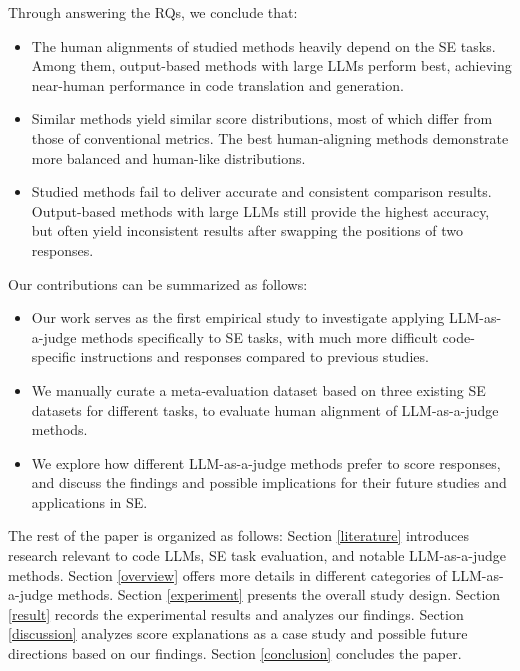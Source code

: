 Through answering the RQs, we conclude that:
\begin{itemize}
    \item The human alignments of studied methods heavily depend on the SE tasks. Among them, output-based methods with large LLMs perform best, achieving near-human performance in code translation and generation.
    \item Similar methods yield similar score distributions, most of which differ from those of conventional metrics. The best human-aligning methods demonstrate more balanced and human-like distributions.
    \item Studied methods fail to deliver accurate and consistent comparison results. Output-based methods with large LLMs still provide the highest accuracy, but often yield inconsistent results after swapping the positions of two responses.
\end{itemize}

Our contributions can be summarized as follows:
\begin{itemize}
    \item Our work serves as the first empirical study to investigate applying LLM-as-a-judge methods specifically to SE tasks, with much more difficult code-specific instructions and responses compared to previous studies.
    \item We manually curate a meta-evaluation dataset based on three existing SE datasets for different tasks, to evaluate human alignment of LLM-as-a-judge methods.
    \item We explore how different LLM-as-a-judge methods prefer to score responses, and discuss the findings and possible implications for their future studies and applications in SE.
\end{itemize}

The rest of the paper is organized as follows: Section \ref{literature} introduces research relevant to code LLMs, SE task evaluation, and notable LLM-as-a-judge methods. Section \ref{overview} offers more details in different categories of LLM-as-a-judge methods. Section \ref{experiment} presents the overall study design. Section \ref{result} records the experimental results and analyzes our findings. Section \ref{discussion} analyzes score explanations as a case study and possible future directions based on our findings. Section \ref{conclusion} concludes the paper.